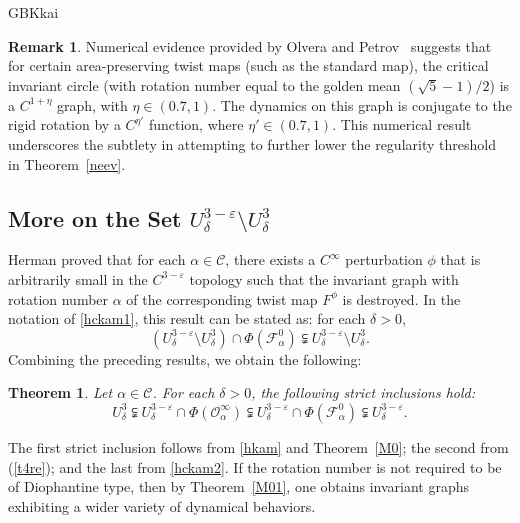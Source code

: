 \documentclass{amsart}
\newcommand{\eps}{\varepsilon}
\newtheorem{Theorem}{Theorem}
\theoremstyle{definition}
\newtheorem{Remark}[Definition]{Remark}
\begin{document}
\begin{CJK*}{GBK}{kai}
		\begin{Remark}
			Numerical evidence provided by Olvera and Petrov~\cite{OP} suggests that for certain area-preserving twist maps (such as the standard map), the critical invariant circle (with rotation number equal to the golden mean \( (\sqrt{5}-1)/2 \)) is a \( C^{1+\eta} \) graph, with \( \eta \in (0.7, 1) \). The dynamics on this graph is conjugate to the rigid rotation by a \( C^{\eta'} \) function, where \( \eta' \in (0.7, 1) \). This numerical result underscores the subtlety in attempting to further lower the regularity threshold in Theorem~\ref{neev}.
		\end{Remark}
		
		\vspace{1ex}
		
		\subsection{More on the Set $U_\delta^{3-\eps} \setminus U_\delta^3$ }
Herman \cite[Theorem 4.9]{H1} proved that for each $\alpha \in \mathcal{C}$, there exists a $C^\infty$ perturbation $\phi$ that is arbitrarily small in the $C^{3-\varepsilon}$ topology such that the invariant graph with rotation number $\alpha$ of the corresponding twist map $F^\phi$ is destroyed. In the notation of \eqref{hckam1}, this result can be stated as: for each $\delta > 0$,
\begin{equation}\label{hckam2}
(U_\delta^{3 - \varepsilon} \setminus U_\delta^3) \cap \Phi(\mathcal{F}^0_\alpha) \subsetneqq U_\delta^{3 - \varepsilon} \setminus U_\delta^3.
\end{equation}
Combining the preceding results, we obtain the following:

\begin{Theorem}
Let $\alpha \in \mathcal{C}$. For each $\delta > 0$, the following strict inclusions hold:
\[
U_\delta^{3} \subsetneqq U_\delta^{3 - \varepsilon} \cap \Phi(\mathcal{O}_\alpha^\infty) \subsetneqq U_\delta^{3 - \varepsilon} \cap \Phi(\mathcal{F}_\alpha^0) \subsetneqq U_\delta^{3 - \varepsilon}.
\]
\end{Theorem}

\vspace{1ex}

The first strict inclusion follows from \eqref{hkam} and Theorem~\ref{M0}; the second from (\ref{t4re}); and the last from \eqref{hckam2}. If the rotation number is not required to be of Diophantine type, then by Theorem~\ref{M01}, one obtains invariant graphs exhibiting a wider variety of dynamical behaviors.
	

\end{CJK*}
\end{document}
